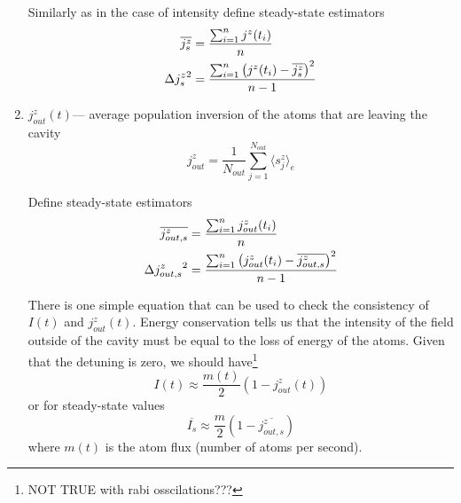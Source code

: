 \documentclass{article}
\begin{document}
\begin{enumerate}
        Similarly as in the case of intensity define steady-state estimators
    \begin{align}
    \label{estimator;jz}
        \notag \overline{j^z_s} &= \frac{\sum_{i=1}^{n} j^z(t_i)}{n}\\
               {\Delta j^z_s}^2 &= \frac{\sum_{i=1}^{n} \left(j^z(t_i)-\overline{j^z_s}\right)^2}{n-1}
    \end{align}

    \item $j^z_{out}(t)$\---- average population inversion of the atoms that are leaving the cavity
        \begin{equation}
            j^z_{out} = \frac{1}{N_{out}} \sum_{j=1}^{N_{out}}\langle s_j^z\rangle_e
        \end{equation}
        
        Define steady-state estimators
    \begin{align}
    \label{estimator;jzout}
        \notag \overline{j^z_{out,s}} &= \frac{\sum_{i=1}^{n} j^z_{out}(t_i)}{n}\\
               {\Delta j^z_{out,s}}^2 &= \frac{\sum_{i=1}^{n} \left(j^z_{out}(t_i)-\overline{j^z_{out,s}}\right)^2}{n-1}
    \end{align}
    
        There is one simple equation that can be used to check the consistency of $I(t)$ and $j^z_{out}(t)$. Energy conservation tells us that the intensity of the field outside of the cavity must be equal to the loss of energy of the atoms. Given that the detuning is zero, we should have\footnote{NOT TRUE with rabi osscilations???}
        \begin{equation}
            \label{energyConservation}
            I(t) \approx \frac{m(t)}{2}\left(1-j^z_{out}(t)\right)
        \end{equation}
        or for steady-state values
         \begin{equation}
            \label{energyConservation;steadyState}
            \overline{I_s} \approx \frac{m}{2}\left(1-\overline{j^z_{out,s}}\right)
        \end{equation}
        where $m(t)$ is the atom flux (number of atoms per second).
    

\end{enumerate}
\end{document}
